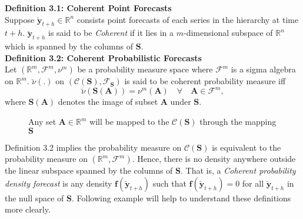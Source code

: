 \documentclass[a4paper, 11pt]{article}
\begin{document}
\noindent
\textbf{Definition 3.1: Coherent Point Forecasts}\\
\noindent
Suppose $\bm{\breve{y}}_{t+h} \in \mathbb{R}^n$ consists point forecasts of each series in the hierarchy at time $t+h$.  $\bm{\breve{y}}_{t+h}$ is said to be \textit{Coherent} if it lies in a $m$-dimensional subspace of $\bm{\mathbb{R}}^n$ which is spanned by the columns of $\bm{S}$. \\

\noindent
\textbf{Definition 3.2: Coherent Probabilistic Forecasts}\\
\noindent
Let $(\bm{\mathbb{R}}^m, \bm{\mathscr{F}}^m, \nu^m)$ be a probability measure space where $\mathscr{F}^m$ is a sigma algebra on $\bm{\mathbb{R}}^m$. $\breve{\nu}(.)$ on $(\mathscr{C}(\bm{S}), \mathscr{F}_{\bm{S}})$ is said to be coherent probability measure iff $$\breve{\nu}(\bm{S}(\bm{A})) = \nu^m(\bm{A}) \quad \forall \quad \bm{A} \in \mathscr{F}^m,$$ where $\bm{S}(\bm{A})$ denotes the image of subset $\bm{A}$ under $\bm{S}$. 

\usetikzlibrary{arrows,positioning,shapes,fit,calc}

\begin{figure}[H]
	\begin{center}
		\newline
	\end{center}
	\caption{Any set $\bm{A} \in \bm{\mathbb{R}}^m$ will be mapped to the $\mathscr{C}(\bm{S})$ through the mapping $\bm{S}$}
\end{figure}
\noindent
Definition 3.2 implies the probability measure on $\mathscr{C}(\bm{S})$ is equivalent to the probability measure on $(\bm{\mathbb{R}}^m, \bm{\mathscr{F}}^m)$. Hence, there is no density anywhere outside the linear subspace spanned by the columns of $\bm{S}$. That is, a \textit{Coherent probability density forecast} is any density $\bm{f}(\bm{\breve{y}}_{t+h})$ such that $\bm{f}(\bm{\breve{y}}_{t+h})=0$ for all $\bm{\breve{y}}_{t+h}$ in the null space of $\bm{S}$. Following example will help to understand these definitions more clearly.\\
\end{document}
